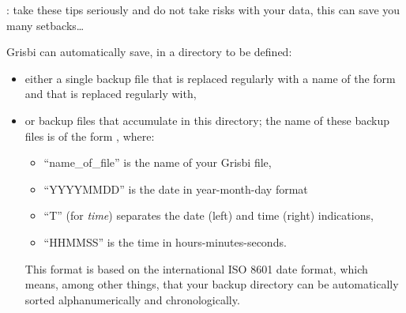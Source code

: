 \Note{}: take these tips seriously and do not take risks with your data, this can save you many setbacks\ldots

Grisbi can automatically save, in a directory to be defined:
\begin{itemize}
	\item either a single backup file that is replaced regularly with a name of the form  and that is replaced regularly with,
	\item or backup files that accumulate in this directory; the name of these backup files is of the form , where:
		\begin{itemize}
			\item \enquote{name\_of\_file} is the name of your Grisbi file,
			\item \enquote{YYYYMMDD} is the date in year-month-day format
			\item \enquote{T} (for \emph{time}) separates the date (left) and time (right) indications,
			\item \enquote{HHMMSS} is the time in hours-minutes-seconds.
		\end{itemize}
	This format is based on the international ISO 8601 date format, which means, among other things, that your backup directory can be automatically sorted alphanumerically and chronologically.
\end{itemize}

